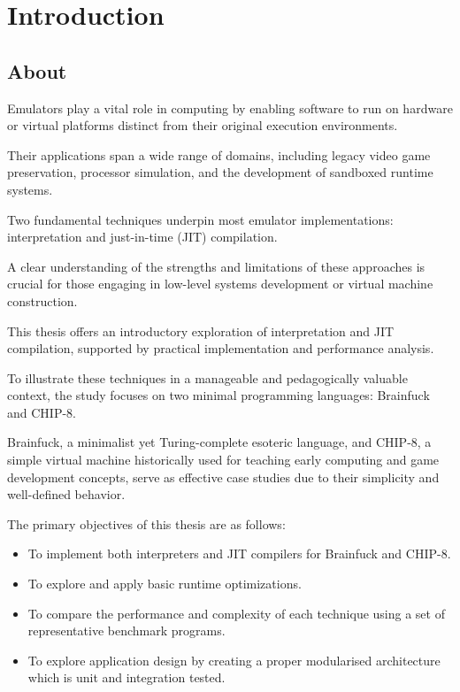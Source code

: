 \chapter{Introduction}
\label{chap:ch1}

\section{About}
\label{chap:ch1sec1}

\par Emulators play a vital role in computing by enabling software to run on hardware or virtual platforms distinct from their original execution environments.

\par Their applications span a wide range of domains, including legacy video game preservation, processor simulation, and the development of sandboxed runtime systems.

\par Two fundamental techniques underpin most emulator implementations: interpretation and just-in-time (JIT) compilation.

\par A clear understanding of the strengths and limitations of these approaches is crucial for those engaging in low-level systems development or virtual machine construction.

\par This thesis offers an introductory exploration of interpretation and JIT compilation, supported by practical implementation and performance analysis.

\par To illustrate these techniques in a manageable and pedagogically valuable context, the study focuses on two minimal programming languages: Brainfuck and CHIP-8.

\par Brainfuck, a minimalist yet Turing-complete esoteric language, and CHIP-8, a simple virtual machine historically used for teaching early computing and game development concepts, serve as effective case studies due to their simplicity and well-defined behavior.

\par The primary objectives of this thesis are as follows:

\begin{itemize}
	\item To implement both interpreters and JIT compilers for Brainfuck and CHIP-8.
	\item To explore and apply basic runtime optimizations.
	\item To compare the performance and complexity of each technique using a set of representative benchmark programs.
	\item To explore application design by creating a proper modularised architecture which is unit and integration tested.
\end{itemize}

